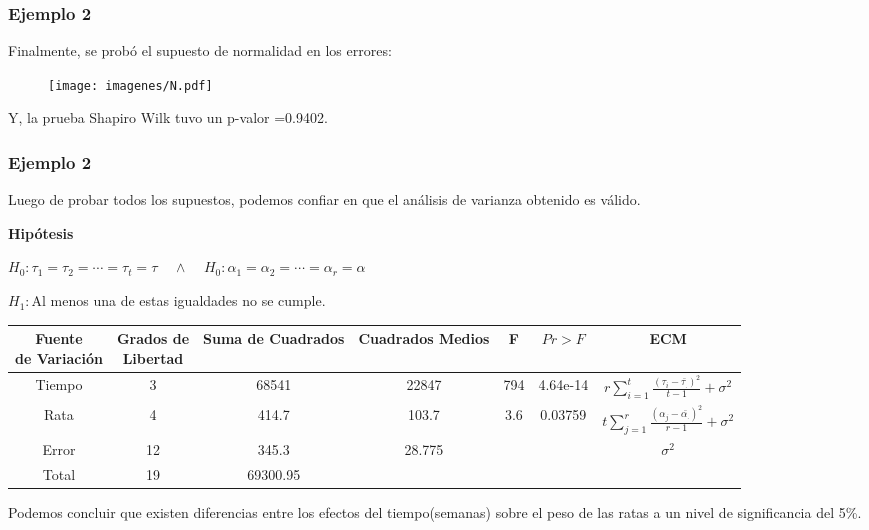 \documentclass[12pt]{beamer}
\begin{document}
\begin{frame}
\frametitle{Ejemplo 2}
Finalmente, se probó el supuesto de normalidad en los errores:
\begin{figure}[h!]
  \centering
  \texttt{[image: imagenes/N.pdf]}
\end{figure}
Y, la prueba Shapiro Wilk tuvo un p-valor =0.9402.
\end{frame}

\begin{frame}
\frametitle{Ejemplo 2}
Luego de probar todos los supuestos, podemos confiar en que el análisis de varianza obtenido es válido.

\textbf{Hipótesis}
\begin{center}
$H_0:\tau_1=\tau_2=\cdots=\tau_t=\tau \;\;\;\; \wedge \;\;\;\; H_0:\alpha_1=\alpha_2=\cdots=\alpha_r=\alpha $

$H_1:$Al menos una de estas igualdades no se cumple.
\end{center}
\begin{table}[htbp]
  \centering
\resizebox{12cm}{!} {
\begin{tabular}{|c|c|c|c|c|c|c|}
\hline 
\parbox{7em}{\centering Fuente\\ de Variación} & \parbox{7em}{\centering Grados de\\ Libertad} & Suma de Cuadrados & Cuadrados Medios & F & $Pr>F$ & ECM \\ 
\hline 
Tiempo & 3 & 68541 & 22847 & 794 & 4.64e-14  & $r\sum\limits_{i=1}^{t}\frac{(\tau_i-\bar{\tau_{.}})^2}{t-1}+\sigma^2$\\ 
Rata & 4 & 414.7 & 103.7 & 3.6 & 0.03759 &$t\sum\limits_{j=1}^{r}\frac{(\alpha_{j}-\bar{\alpha_{.}})^2}{r-1}+\sigma^2$ \\
Error & 12 & 345.3 & 28.775 &   & & $\sigma^2$\\ 
Total & 19 & 69300.95 &  &   & &\\ 
\hline 
\end{tabular} 
}
\label{tab:addlabel}%
\end{table}%
Podemos concluir que existen diferencias entre los efectos del tiempo(semanas) sobre el peso de las ratas a un nivel de
significancia del 5\%.
\end{frame}
\end{document}
